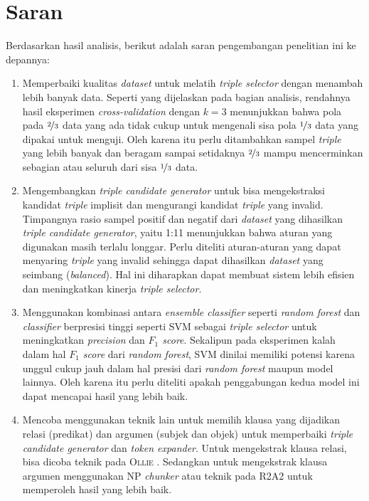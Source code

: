 \section{Saran}

Berdasarkan hasil analisis, berikut adalah saran pengembangan penelitian ini ke depannya:

\begin{enumerate}
	\item Memperbaiki kualitas \textit{dataset} untuk melatih \textit{triple selector} dengan menambah lebih banyak data. Seperti yang dijelaskan pada bagian analisis, rendahnya hasil eksperimen \textit{cross-validation} dengan $k = 3$ menunjukkan bahwa pola pada $\nicefrac{2}{3}$ data yang ada tidak cukup untuk mengenali sisa pola $\nicefrac{1}{3}$ data yang dipakai untuk menguji. Oleh karena itu perlu ditambahkan sampel \textit{triple} yang lebih banyak dan beragam sampai setidaknya $\nicefrac{2}{3}$ mampu mencerminkan sebagian atau seluruh dari sisa $\nicefrac{1}{3}$ data.
	
	\item Mengembangkan \textit{triple candidate generator} untuk bisa mengekstraksi kandidat \textit{triple} implisit dan mengurangi kandidat \textit{triple} yang invalid. Timpangnya rasio sampel positif dan negatif dari \textit{dataset} yang dihasilkan \textit{triple candidate generator}, yaitu 1:11 menunjukkan bahwa aturan yang digunakan masih terlalu longgar. Perlu diteliti aturan-aturan yang dapat menyaring \textit{triple} yang invalid sehingga dapat dihasilkan \textit{dataset} yang seimbang (\textit{balanced}). Hal ini diharapkan dapat membuat sistem lebih efisien dan meningkatkan kinerja \textit{triple selector}.
	
	\item Menggunakan kombinasi antara \textit{ensemble classifier} seperti \textit{random forest} dan \textit{classifier} berpresisi tinggi seperti SVM sebagai \textit{triple selector} untuk meningkatkan \textit{precision} dan \textit{$F_1$ score}. Sekalipun pada eksperimen kalah dalam hal \textit{$F_1$ score} dari \textit{random forest}, SVM dinilai memiliki potensi karena unggul cukup jauh dalam hal presisi dari \textit{random forest} maupun model lainnya. Oleh karena itu perlu diteliti apakah penggabungan kedua model ini dapat mencapai hasil yang lebih baik.
	
	\item Mencoba menggunakan teknik lain untuk memilih klausa yang dijadikan relasi (predikat) dan argumen (subjek dan objek) untuk memperbaiki \textit{triple candidate generator} dan \textit{token expander}. Untuk mengekstrak klausa relasi, bisa dicoba teknik pada \textsc{Ollie} \citep{schmitz2012open}. Sedangkan untuk mengekstrak klausa argumen menggunakan NP \textit{chunker} atau teknik pada \textsc{R2A2} \citep{etzioni2011open} untuk memperoleh hasil yang lebih baik.
	

\end{enumerate}
